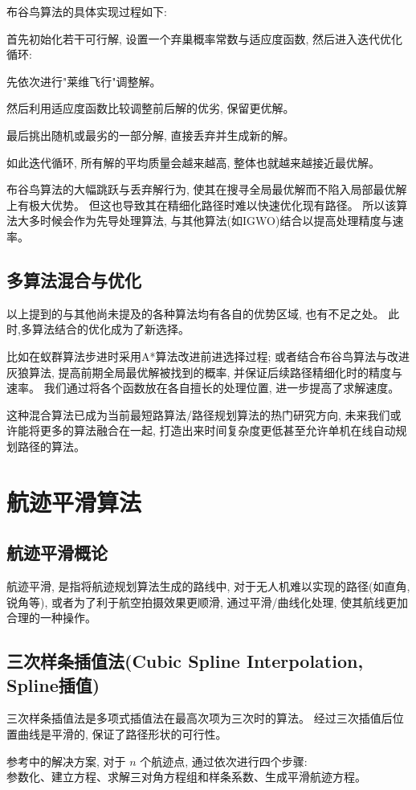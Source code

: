\documentclass[12pt,a4paper,oneside,UTF8]{ctexart}
\begin{document}
布谷鸟算法的具体实现过程如下:

首先初始化若干可行解,
设置一个弃巢概率常数与适应度函数,
然后进入迭代优化循环:

先依次进行"莱维飞行"调整解。

然后利用适应度函数比较调整前后解的优劣,
保留更优解。

最后挑出随机或最劣的一部分解,
直接丢弃并生成新的解。

如此迭代循环,
所有解的平均质量会越来越高,
整体也就越来越接近最优解。

布谷鸟算法的大幅跳跃与丢弃解行为,
使其在搜寻全局最优解而不陷入局部最优解上有极大优势。
但这也导致其在精细化路径时难以快速优化现有路径。
所以该算法大多时候会作为先导处理算法,
与其他算法(如IGWO)结合以提高处理精度与速率。
\subsection{多算法混合与优化}
以上提到的与其他尚未提及的各种算法均有各自的优势区域,
也有不足之处。
此时,多算法结合的优化成为了新选择。

比如在蚁群算法步进时采用A*算法改进前进选择过程;
或者结合布谷鸟算法与改进灰狼算法,
提高前期全局最优解被找到的概率,
并保证后续路径精细化时的精度与速率。
我们通过将各个函数放在各自擅长的处理位置,
进一步提高了求解速度。

这种混合算法已成为当前最短路算法/路径规划算法的热门研究方向,
未来我们或许能将更多的算法融合在一起,
打造出来时间复杂度更低甚至允许单机在线自动规划路径的算法。
\newpage\section{航迹平滑算法}
\subsection{航迹平滑概论}
航迹平滑,
是指将航迹规划算法生成的路线中,
对于无人机难以实现的路径(如直角,锐角等),
或者为了利于航空拍摄效果更顺滑,
通过平滑/曲线化处理,
使其航线更加合理的一种操作。
\subsection{三次样条插值法(Cubic Spline Interpolation, Spline插值)}
三次样条插值法是多项式插值法在最高次项为三次时的算法。
经过三次插值后位置曲线是平滑的,
保证了路径形状的可行性。

参考\cite{ref11}中的解决方案,
对于 $n$ 个航迹点,
通过依次进行四个步骤:\\
参数化、建立方程、求解三对角方程组和样条系数、生成平滑航迹方程。
\end{document}

